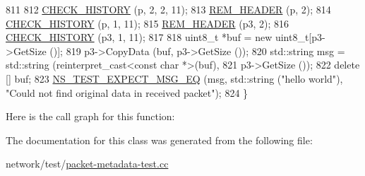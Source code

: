 \begin{DoxyCode}
811 
812   \hyperlink{packet-metadata-test_8cc_a15a730e778d9d498a39e778bcd39684c}{CHECK\_HISTORY} (p, 2, 2, 11);
813   \hyperlink{packet-metadata-test_8cc_a8694c61c9ba33c72896dde3628538a84}{REM\_HEADER} (p, 2);
814   \hyperlink{packet-metadata-test_8cc_a15a730e778d9d498a39e778bcd39684c}{CHECK\_HISTORY} (p, 1, 11);
815   \hyperlink{packet-metadata-test_8cc_a8694c61c9ba33c72896dde3628538a84}{REM\_HEADER} (p3, 2);
816   \hyperlink{packet-metadata-test_8cc_a15a730e778d9d498a39e778bcd39684c}{CHECK\_HISTORY} (p3, 1, 11);
817 
818   uint8\_t *buf = \textcolor{keyword}{new} uint8\_t[p3->GetSize ()];
819   p3->CopyData (buf, p3->GetSize ());
820   std::string msg = std::string (reinterpret\_cast<const char *>(buf),
821                                  p3->GetSize ());
822   \textcolor{keyword}{delete} [] buf;
823   \hyperlink{group__testing_ga7304ba46a28d8cf08dfdfd6499cf7068}{NS\_TEST\_EXPECT\_MSG\_EQ} (msg, std::string (\textcolor{stringliteral}{"hello world"}), \textcolor{stringliteral}{"Could not find original
       data in received packet"});
824 \}
\end{DoxyCode}


Here is the call graph for this function\+:




The documentation for this class was generated from the following file\+:\begin{DoxyCompactItemize}
\item 
network/test/\hyperlink{packet-metadata-test_8cc}{packet-\/metadata-\/test.\+cc}\end{DoxyCompactItemize}
